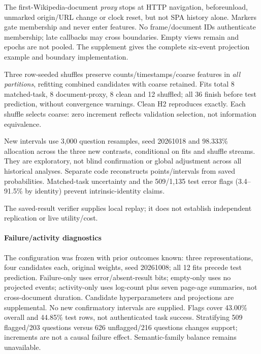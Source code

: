 

The first-Wikipedia-document \emph{proxy} stops at HTTP navigation, beforeunload, unmarked origin/URL change or clock reset, but not SPA history alone. Markers gate membership and never enter features. No frame/document IDs authenticate membership; late callbacks may cross boundaries. Empty views remain and epochs are not pooled. The supplement gives the complete six-event projection example and boundary implementation.

Three row-seeded shuffles preserve counts/timestamps/coarse features in \emph{all partitions}, refitting combined candidates with coarse retained. Fits total 8 matched-task, 8 document-proxy, 8 clean and 12 shuffled; all 36 finish before test prediction, without convergence warnings. Clean H2 reproduces exactly. Each shuffle selects coarse: zero increment reflects validation selection, not information equivalence.



New intervals use 3,000 question resamples, seed 20261018 and 98.333\% allocation across the three new contrasts, conditional on fits and shuffle streams. They are exploratory, not blind confirmation or global adjustment across all historical analyses. Separate code reconstructs points/intervals from saved probabilities. Matched-task uncertainty and the 509/1,135 test error flags (3.4--91.5\% by identity) prevent intrinsic-identity claims.

The saved-result verifier supplies local replay; it does not establish independent replication or live utility/cost.

\paragraph{Failure/activity diagnostics}
The configuration was frozen with prior outcomes known: three representations, four candidates each, original weights, seed 20261008; all 12 fits precede test prediction. Failure-only uses error/absent-result bits; empty-only uses no projected events; activity-only uses log-count plus seven page-age summaries, not cross-document duration. Candidate hyperparameters and projections are supplemental. No new confirmatory intervals are supplied. Flags cover 43.00\% overall and 44.85\% test rows, not authenticated task success. Stratifying 509 flagged/203 questions versus 626 unflagged/216 questions changes support; increments are not a causal failure effect. Semantic-family balance remains unavailable.

